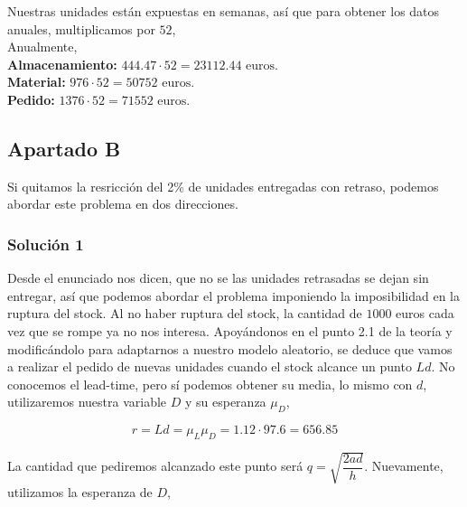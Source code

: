 \documentclass[a4paper,12pt]{article}
\begin{document}
Nuestras unidades est\'an expuestas en semanas, as\'i que para obtener los datos anuales, multiplicamos por $52$,\\

Anualmente,\\


\textbf{Almacenamiento:} $444.47\cdot 52 =  23112.44 \text{ euros.}$\\
\textbf{Material:} $976\cdot 52 = 50752\text{ euros.}$\\
\textbf{Pedido:} $1376\cdot 52 = 71552\text{ euros.}$\\



\pagebreak

\subsection{Apartado B}

Si quitamos la resricci\'on del 2\% de unidades entregadas con retraso, podemos abordar este problema en dos direcciones.


\subsubsection{Soluci\'on 1}
Desde el enunciado nos dicen, que no se las unidades retrasadas se dejan sin entregar, as\'i que podemos abordar el problema imponiendo la imposibilidad en la ruptura del stock. Al no haber ruptura del stock, la cantidad de $1000$ euros cada vez que se rompe ya no nos interesa. Apoy\'andonos en el punto 2.1 de la teor\'ia y modific\'andolo para adaptarnos a nuestro modelo aleatorio, se deduce que vamos a realizar el pedido de nuevas unidades cuando el stock alcance un punto $Ld$. No conocemos el lead-time, pero s\'i podemos obtener su media, lo mismo con $d$, utilizaremos nuestra variable $D$ y su esperanza $\mu_D$,

$$ r = Ld = \mu_L \mu_D = 1.12 \cdot 97.6 = 656.85$$

La cantidad que pediremos alcanzado este punto ser\'a $q = \sqrt{\dfrac{2ad}{h}}$. Nuevamente, utilizamos la esperanza de $D$,
\end{document}

